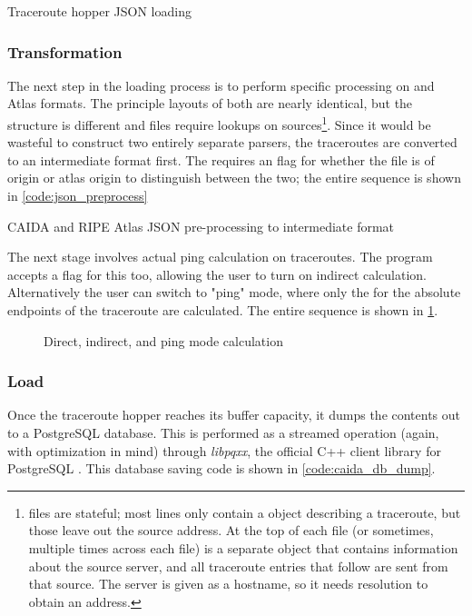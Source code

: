 \begin{code}[h]
    \caption{Traceroute hopper JSON loading}
    \label{code:load_json}
\end{code}

\subsubsection{Transformation} The next step in the loading process is to perform specific processing on \caida and \ripe Atlas \json formats. The principle layouts of both are nearly identical, but the structure is different and \caida files require \dns lookups on sources\footnote{\caida files are stateful; most lines only contain a \json object describing a traceroute, but those leave out the source \ip address. At the top of each file (or sometimes, multiple times across each file) is a separate \json object that contains information about the source server, and all traceroute entries that follow are sent from that source. The server is given as a hostname, so it needs \dns resolution to obtain an \ip address.}. Since it would be wasteful to construct two entirely separate parsers, the traceroutes are converted to an intermediate format first. The \cli requires an flag for whether the file is of \caida origin or \ripe atlas origin to distinguish between the two; the entire sequence is shown in \cref{code:json_preprocess}

\begin{code}[h]
    \caption{CAIDA and RIPE Atlas JSON pre-processing to intermediate format}
    \label{code:json_preprocess}
\end{code}

The next stage involves actual ping calculation on traceroutes. The program \cli accepts a flag for this too, allowing the user to turn on indirect calculation. Alternatively the user can switch to "ping" mode, where only the \rtt for the absolute endpoints of the traceroute are calculated. The entire sequence is shown in \cref{code:rtt_calculation}.

\begin{figure}[h]
    \caption{Direct, indirect, and ping mode calculation}
    \label{code:rtt_calculation}
\end{figure}

\subsubsection{Load} Once the traceroute hopper reaches its buffer capacity, it dumps the contents out to a PostgreSQL database. This is performed as a streamed operation (again, with optimization in mind) through \textit{libpqxx}, the official C++ client library for PostgreSQL \cite{Vermeulen2019LibPQXX}. This database saving code is shown in \cref{code:caida_db_dump}.

